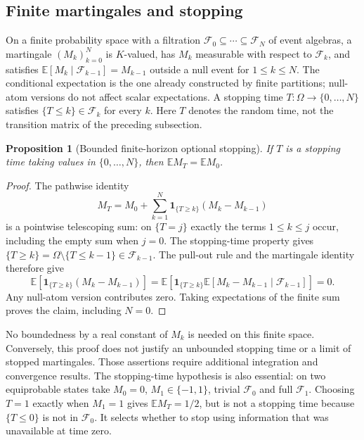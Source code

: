 \documentclass[11pt,a4paper]{article}
\numberwithin{equation}{section}
\newtheorem{proposition}[theorem]{Proposition}
\theoremstyle{definition}
\theoremstyle{remark}
\newcommand{\E}{\mathbb E}
\newcommand{\F}{\mathcal F}
\newcommand{\ind}{\mathbf 1}
\begin{document}
\subsection{Finite martingales and stopping}\label{fsp:sub:stopping}

On a finite probability space with a filtration
$\F_0\subseteq\cdots\subseteq\F_N$ of event algebras, a martingale
$(M_k)_{k=0}^N$ is $K$-valued, has $M_k$ measurable with respect to
$\F_k$, and satisfies $\E[M_k\mid\F_{k-1}]=M_{k-1}$ outside a null
event for $1\le k\le N$. The conditional expectation is the one already
constructed by finite partitions; null-atom versions do not affect scalar
expectations. A stopping time $T:\Omega\to\{0,\ldots,N\}$ satisfies
$\{T\le k\}\in\F_k$ for every $k$. Here $T$ denotes the random time,
not the transition matrix of the preceding subsection.

\begin{proposition}[Bounded finite-horizon optional stopping]
If $T$ is a stopping time taking values in $\{0,\ldots,N\}$, then
$\E M_T=\E M_0$.
\end{proposition}
\begin{proof}
The pathwise identity
\begin{equation}
 M_T=M_0+\sum_{k=1}^N\ind_{\{T\ge k\}}(M_k-M_{k-1})
\end{equation}
is a pointwise telescoping sum: on $\{T=j\}$ exactly the terms
$1\le k\le j$ occur, including the empty sum when $j=0$.
The stopping-time property gives
$\{T\ge k\}=\Omega\setminus\{T\le k-1\}\in\F_{k-1}$.
The pull-out rule and the martingale identity therefore give
\[
 \E[\ind_{\{T\ge k\}}(M_k-M_{k-1})]
 =\E\!\left[\ind_{\{T\ge k\}}
       \E[M_k-M_{k-1}\mid\F_{k-1}]\right]=0.
\]
Any null-atom version contributes zero. Taking expectations of the
finite sum proves the claim, including $N=0$.
\end{proof}

No boundedness by a real constant of $M_k$ is needed on this finite
space. Conversely, this proof does not justify an unbounded stopping
time or a limit of stopped martingales. Those assertions require
additional integration and convergence results. The stopping-time
hypothesis is also essential: on two equiprobable states take $M_0=0$,
$M_1\in\{-1,1\}$, trivial $\F_0$ and full $\F_1$.
Choosing $T=1$ exactly when $M_1=1$ gives $\E M_T=1/2$,
but is not a stopping time because $\{T\le0\}$ is not in $\F_0$.
It selects whether to stop using information that was unavailable at time zero.
\end{document}
